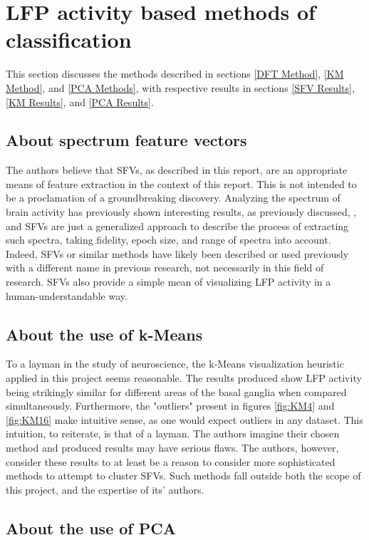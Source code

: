 \documentclass{kththesis}
\begin{document}
\section{LFP activity based methods of classification}

This section discusses the methods described in sections \ref{DFT Method}, \ref{KM Method}, and \ref{PCA Methods}, with respective results in sections \ref{SFV Results}, \ref{KM Results}, and \ref{PCA Results}.

\subsection{About spectrum feature vectors}

The authors believe that SFVs, as described in this report, are an appropriate means of feature extraction in the context of this report. 
This is not intended to be a proclamation of a groundbreaking discovery.
Analyzing the spectrum of brain activity has previously shown interesting results, as previously discussed, \parencite{Cagnan}, and SFVs are just a generalized approach to describe the process of extracting such spectra, taking fidelity, epoch size, and range of spectra into account.
Indeed, SFVs or similar methods have likely been described or used previously with a different name in previous research, not necessarily in this field of research.
SFVs also provide a simple mean of visualizing LFP activity in a human-understandable way.

\subsection{About the use of k-Means}

To a layman in the study of neuroscience, the k-Means visualization heuristic applied in this project seems reasonable.
The results produced show LFP activity being strikingly similar for different areas of the basal ganglia when compared simultaneously.
Furthermore, the "outliers" present in figures \ref{fig:KM4} and \ref{fig:KM16} make intuitive sense, as one would expect outliers in any dataset.
This intuition, to reiterate, is that of a layman.
The authors imagine their chosen method and produced results may have serious flaws.
The authors, however, consider these results to at least be a reason to consider more sophisticated methods to attempt to cluster SFVs.
Such methods fall outside both the scope of this project, and the expertise of its' authors.

\subsection{About the use of PCA}
\end{document}
